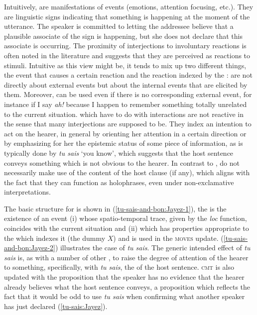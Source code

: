 \documentclass[output=paper,colorlinks,citecolor=brown]{langscibook}
\begin{document}
Intuitively,  are manifestations of events (emotions, attention focusing, etc.). They are linguistic signs indicating that something is happening at the moment of the utterance. The speaker is committed to letting the addressee believe that a plausible associate of the sign is happening, but she does not declare that this associate is occurring. The proximity of interjections to involuntary reactions is often noted in the literature and suggests that they are perceived as reactions to stimuli. Intuitive as this view might be, it tends to mix up two different things, the event that causes a certain reaction and the reaction indexed by the :  are not directly about external events but about the internal events that are elicited by them. Moreover,  can be used even if there is no corresponding external event, for instance if I say \textit{ah!} because I happen to remember something totally unrelated to the current situation.  which have to do with interactions are not reactive in the sense that many interjections are supposed to be. They index an intention to act on the hearer, in general by orienting her attention in a certain direction or by emphasizing for her the epistemic status of some piece of information, as is typically done by \textit{tu sais} `you know', which suggests that the host sentence conveys something which is not obvious to the hearer. In contrast to  ,  do not necessarily make use of the content of the host clause (if any), which aligns with the fact that they can function as holophrases, even under non-exclamative interpretations.

The basic structure for  is shown in (\ref{tu-sais-and-bon:Jayez-1}), the  is the existence of an event (i) whose spatio-temporal trace, given by the \textit{loc} function, coincides with the current situation and (ii) which has properties appropriate to the  which indexes it (the dummy $X$) and is used in the \textsc{moves} update. (\ref{tu-sais-and-bon:Jayez-2}) illustrates the case of \textit{tu sais}. The generic intended effect of \textit{tu sais} is, as with a number of other , to raise the degree of attention of the hearer to something, specifically, with \textit{tu sais}, the  of the host sentence. \textsc{cmt} is also updated with the proposition that the speaker has no evidence that the hearer already believes what the host sentence conveys, a proposition which reflects the fact that it would be odd to use \textit{tu sais} when confirming what another speaker has just declared (\ref{tu-sais:Jayez}).
\end{document}
